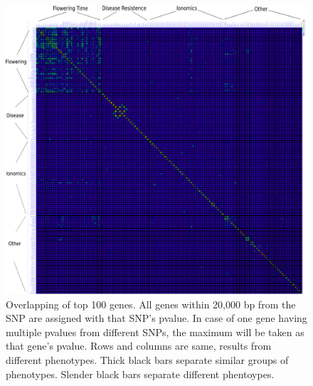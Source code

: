 \documentclass[a4paper,10pt]{article}
\begin{document}
\begin{figure}
  \includegraphics[width=1\textwidth]{figures/overlapping_results_a100_inkscape.png}
  \caption{Overlapping of top 100 genes. All genes within 20,000 bp from the SNP are assigned with that SNP's pvalue. In case of one gene having multiple pvalues from different SNPs, the maximum will be taken as that gene's pvalue. Rows and columns are same, results from different phenotypes. Thick black bars separate similar groups of phenotypes. Slender black bars separate different phentoypes.}\label{f6}
\end{figure}
\end{document}
